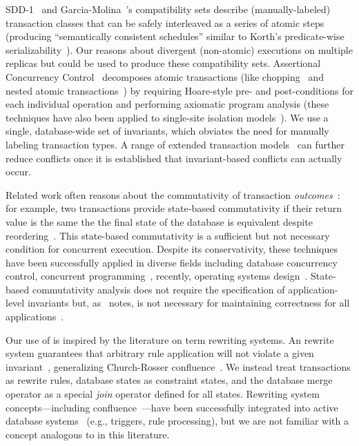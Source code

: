 SDD-1~\cite{sdd1} and Garcia-Molina~\cite{garciamolina-semantics}'s
compatibility sets describe (manually-labeled) transaction classes
that can be safely interleaved as a series of atomic steps (producing
``semantically consistent schedules'' similar to Korth's
predicate-wise serializability~\cite{korth-serializability}). Our
\iconfluence reasons about divergent (non-atomic) executions on
multiple replicas but could be used to produce these compatibility
sets. Assertional Concurrency Control~\cite{decomp-semantics}
decomposes atomic transactions (like chopping~\cite{chopping} and
nested atomic transactions~\cite{atomictransactions}) by requiring
Hoare-style pre- and post-conditions for each individual operation and
performing axiomatic program analysis (these techniques have also been
applied to single-site isolation
models~\cite{isolation-semantics}). We use a single, database-wide set
of invariants, which obviates the need for manually labeling
transaction types. A range of extended transaction models~\cite{acta}
can further reduce conflicts once it is established that
invariant-based conflicts can actually occur.

 Related work often reasons about
the commutativity of transaction \textit{outcomes}~\cite{boosting}:
for example, two transactions provide state-based commutativity if
their return value is the same the the final state of the database is
equivalent despite reordering~\cite{weihl-thesis}. This
state-based commutativity is a sufficient but not necessary condition
for concurrent execution. Despite its conservativity, these techniques
have been successfully applied in diverse fields including database
concurrency control, concurrent programming~\cite{boosting}, recently,
operating systems design~\cite{kohler-commutativity}. State-based
commutativity analysis does not require the specification of
application-level invariants but, as~\cite{kohler-commutativity}
notes, is not necessary for maintaining correctness for all
applications~\cite{lamport-audit}.

 Our use of \iconfluence is inspired by the
literature on term rewriting systems. An \iconfluent rewrite system
guarantees that arbitrary rule application will not violate a given
invariant~\cite{obs-confluence}, generalizing Church-Rosser
confluence~\cite{termrewriting}. We instead treat transactions as
rewrite rules, database states as constraint states, and the database
merge operator as a special \textit{join} operator defined for all
states.  Rewriting system concepts---including
confluence~\cite{aiken-confluence}---have been successfully integrated
into active database systems~\cite{activedb-book} (e.g., triggers,
rule processing), but we are not familiar with a concept analogous to
\iconfluence in this literature.

